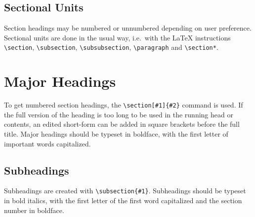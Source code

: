 \subsection{Sectional Units}
Section headings may be numbered or unnumbered depending on user
preference. Sectional units are done in the usual way, i.e.~with the
\LaTeX{} instructions \verb|\section|, \verb|\subsection|,
\verb|\subsubsection|, \verb|\paragraph| and \verb|\section*|.

\section{Major Headings}
To get numbered section headings, the \verb|\section[#1]{#2}|
command is used. If the full version of the heading is too long to
be used in the running head or contents, an edited short-form can be
added in square brackets before the full title. Major headings
should be typeset in boldface, with the first letter of important
words capitalized.

\subsection{Subheadings}
Subheadings are created with \verb|\subsection{#1}|. Subheadings
should be typeset in bold italics, with the first letter of the first
word capitalized and the section number in boldface.

